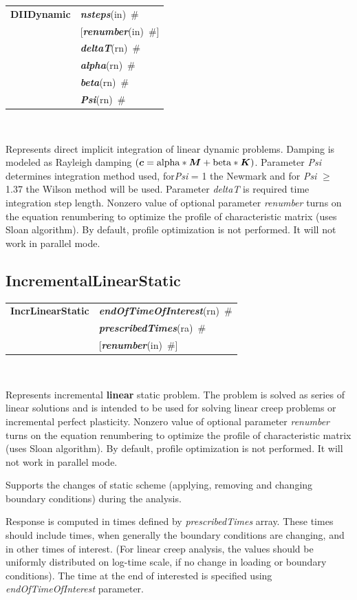 \documentclass[a4paper]{article}
\makeatletter
\newcommand{\mbf}[1]{\mbox{\boldmath$#1$}}
\newcommand{\param}[1]{{\em #1}}
\newcommand{\keywordnotype}[1]{\mbox{{\it{\bf{#1}}}}}
\newcommand{\keyword}[2]{\mbox{{\keywordnotype{#1}\tiny (#2)}}}
\newcommand{\entKeywordInst}[1]{\mbox{{\bf{{#1}}}}}
\newcommand{\field}[2]{\mbox{\keyword{#1}{#2}~\#}}
\newcommand{\optField}[2]{\mbox{[\field{#1}{#2}]}}
\newenvironment{record}[1][]{\begin{tabular}{|ll}}{\end{tabular}\\}
\newcommand{\recentry}[2]{{#1}&{#2}\\}
\newcounter{rcc}
\newenvironment{record}[1][\textwidth]{\setcounter{rcc}{0}\begin{tabular*}{#1}{|ll@{\extracolsep{\fill}}r}}{\end{tabular*}\\}
\newcommand{\recentry}[2]{\ifthenelse{\value{rcc}>0}{&$\backslash$ \\}{\setcounter{rcc}{1}}{#1}&{#2}}
\makeatother
\begin{document}
\begin{record}
\recentry{\entKeywordInst{DIIDynamic}}{\field{nsteps}{in}}
\recentry{}{\optField{renumber}{in}}
\recentry{}{\field{deltaT}{rn}} \recentry{}{\field{alpha}{rn}} \recentry{}{\field{beta}{rn}}
\recentry{}{\field{Psi}{rn}}
\end{record}

Represents direct implicit integration of linear dynamic
problems. Damping is modeled as Rayleigh damping $(\mbf{c} =
\rm{alpha}*\mbf{M} + \rm{beta} * \mbf{K})$. Parameter \param{Psi} determines
integration method used, for\param{Psi} = 1 the Newmark and for \param{Psi} $\ge$ 1.37 the Wilson method
will be used. Parameter \param{deltaT} is required time integration
step length.
Nonzero value of optional parameter \param{renumber} turns on the
equation renumbering to optimize the profile of characteristic matrix
(uses Sloan algorithm). By default, profile optimization is not
performed. It will not work in parallel mode.

\subsection{IncrementalLinearStatic}
\label{IncrementalLinearStatic}

\begin{record}
\recentry{\entKeywordInst{IncrLinearStatic}}{\field{endOfTimeOfInterest}{rn}}
\recentry{}{\field{pre\-scri\-bed\-Ti\-mes}{ra}}
\recentry{}{\optField{renumber}{in}}
\end{record}


Represents incremental {\bf linear} static problem.
The problem is solved as series of linear solutions and is intended to
be used for solving linear creep problems or incremental perfect plasticity.
Nonzero value of optional parameter \param{renumber} turns on the
equation renumbering to optimize the profile of characteristic matrix
(uses Sloan algorithm). By default, profile optimization is not
performed. It will not work in parallel mode.

Supports the changes of static scheme (applying, removing and changing  boundary conditions)
during the analysis.

Response is computed in times defined by \param{pre\-scri\-bed\-Ti\-mes}
array. These times should include times, when generally the  boundary
conditions are changing, and in other times of interest. (For linear creep
analysis, the values should be uniformly distributed on log-time scale, if no change in
loading or boundary conditions). The time at the end of interested is
specified using \param{endOfTimeOfInterest} parameter.
\end{document}
